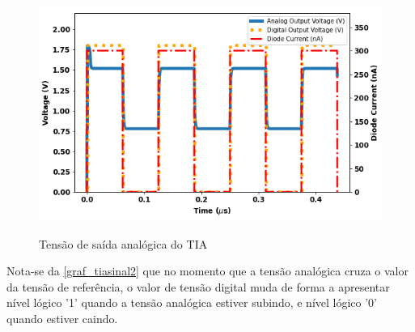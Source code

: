 \begin{figure}[!h]
 \centering
    \caption{Tensão de saída analógica do TIA} 
    \includegraphics[scale=0.7]{Resultados/Graficos/tb_clock.png}
    \label{graf_tiasinal2}
\end{figure}

Nota-se da \autoref{graf_tiasinal2} que no momento que a tensão analógica cruza o valor da tensão de referência, o valor de tensão digital muda de forma a apresentar nível lógico '1' quando a tensão analógica estiver subindo, e nível lógico '0' quando estiver caindo.